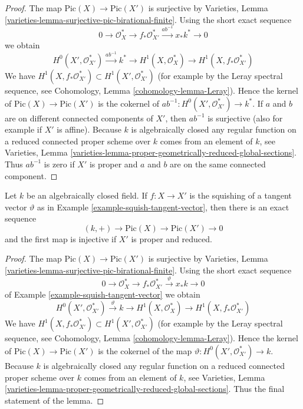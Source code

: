 \begin{proof}
The map $\text{Pic}(X) \to \text{Pic}(X')$ is surjective
by Varieties, Lemma \ref{varieties-lemma-surjective-pic-birational-finite}.
Using the short exact sequence
$$
0 \to \mathcal{O}_X^* \to f_*\mathcal{O}_{X'}^*
\xrightarrow{ab^{-1}} x_*k^* \to 0
$$
we obtain
$$
H^0(X', \mathcal{O}_{X'}^*) \xrightarrow{ab^{-1}} k^* \to
H^1(X, \mathcal{O}_X^*) \to H^1(X, f_*\mathcal{O}_{X'}^*)
$$
We have $H^1(X, f_*\mathcal{O}_{X'}^*) \subset H^1(X', \mathcal{O}_{X'}^*)$
(for example by the Leray spectral sequence, see
Cohomology, Lemma \ref{cohomology-lemma-Leray}).
Hence the kernel of $\text{Pic}(X) \to \text{Pic}(X')$ is the
cokernel of $ab^{-1} : H^0(X', \mathcal{O}_{X'}^*) \to k^*$.
If $a$ and $b$ are on different connected components of $X'$,
then $ab^{-1}$ is surjective (also for example if $X'$ is affine).
Because $k$ is algebraically closed any regular function on a
reduced connected proper scheme over $k$ comes from an element of $k$, see
Varieties, Lemma
\ref{varieties-lemma-proper-geometrically-reduced-global-sections}.
Thus $ab^{-1}$ is zero if $X'$ is proper and $a$ and $b$ are on
the same connected component.
\end{proof}

\begin{lemma}
\label{lemma-squish-tangent-vector}
Let $k$ be an algebraically closed field. If $f : X \to X'$ is the
squishing of a tangent vector $\vartheta$ as in
Example \ref{example-squish-tangent-vector}, then
there is an exact sequence
$$
(k, +) \to \text{Pic}(X) \to \text{Pic}(X') \to 0
$$
and the first map is injective if $X'$ is proper and reduced.
\end{lemma}

\begin{proof}
The map $\text{Pic}(X) \to \text{Pic}(X')$ is surjective
by Varieties, Lemma \ref{varieties-lemma-surjective-pic-birational-finite}.
Using the short exact sequence
$$
0 \to \mathcal{O}_X^* \to f_*\mathcal{O}_{X'}^*
\xrightarrow{\vartheta} x_*k \to 0
$$
of Example \ref{example-squish-tangent-vector} we obtain
$$
H^0(X', \mathcal{O}_{X'}^*) \xrightarrow{\vartheta} k \to
H^1(X, \mathcal{O}_X^*) \to H^1(X, f_*\mathcal{O}_{X'}^*)
$$
We have $H^1(X, f_*\mathcal{O}_{X'}^*) \subset H^1(X', \mathcal{O}_{X'}^*)$
(for example by the Leray spectral sequence, see
Cohomology, Lemma \ref{cohomology-lemma-Leray}).
Hence the kernel of $\text{Pic}(X) \to \text{Pic}(X')$ is the
cokernel of the map $\vartheta : H^0(X', \mathcal{O}_{X'}^*) \to k$.
Because $k$ is algebraically closed any regular function on a
reduced connected proper scheme over $k$ comes from an element of $k$, see
Varieties, Lemma
\ref{varieties-lemma-proper-geometrically-reduced-global-sections}.
Thus the final statement of the lemma.
\end{proof}



